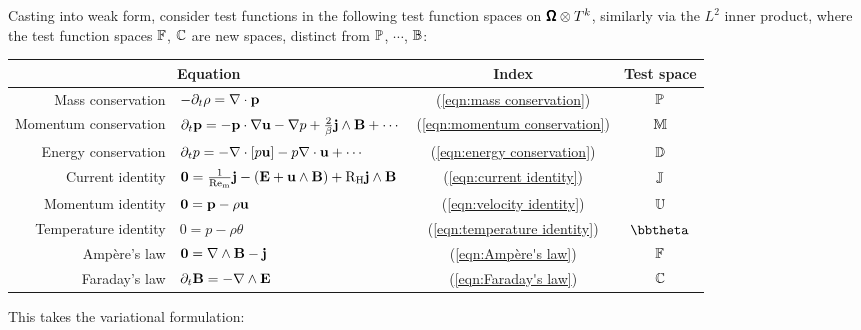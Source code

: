     Casting into weak form, consider test functions in the following test function spaces on $\pmb{\mathsf{\Omega}}\otimes T^{k}$, similarly via the $L^{2}$ inner product, where the test function spaces $\mathbb{F}$, $\mathbb{C}$ are new spaces, distinct from $\mathbb{P}$, $\cdots$, $\mathbb{B}$:
    \begin{center}\begin{tabular}{ r l c | c }
        \multicolumn{2}{c}{Equation}  &  Index  &  Test space  \\
        \hline\hline
        Mass conservation  &  $- \partial_{t}\rho  =  \nabla\cdot\mathbf{p}$  &  (\ref{eqn:mass conservation})  &  $\mathbb{P}$  \\
        Momentum conservation  &  $\partial_{t}\mathbf{p} 
         =  - \mathbf{p}\cdot\nabla\mathbf{u} - \nabla p + \frac{2}{\beta}\mathbf{j}\wedge\mathbf{B} + \cdots$  &  (\ref{eqn:momentum conservation})  &  $\mathbb{M}$  \\
        Energy conservation  &  $\partial_{t}p  =  - \nabla\cdot[p\mathbf{u}] - p\nabla\cdot\mathbf{u} + \cdots$  &  (\ref{eqn:energy conservation})  &  $\mathbb{D}$  \\
        \hline
        Current identity  &  $\mathbf{0}  =  \frac{1}{\mathrm{Re}_{\mathrm{m}}}\mathbf{j} - \left(\mathbf{E} + \mathbf{u}\wedge\mathbf{B}\right) + \mathrm{R}_{\mathrm{H}}\mathbf{j}\wedge\mathbf{B}$  &  (\ref{eqn:current identity})  &  $\mathbb{J}$  \\
        \hline
        Momentum identity  &  $\mathbf{0}  =  \mathbf{p} - \rho\mathbf{u}$  &  (\ref{eqn:velocity identity})  &  $\mathbb{U}$  \\
        Temperature identity  &  $0  =  p - \rho\theta$  &  (\ref{eqn:temperature identity})  &  $\bbtheta$  \\
        \hline
        Ampère's law  &  $\mathbf{0}  =  \nabla\wedge\mathbf{B} - \mathbf{j}$  &  (\ref{eqn:Ampère's law})  &  $\mathbb{F}$  \\
        Faraday's law  &  $\partial_{t}\mathbf{B}  =  - \nabla\wedge\mathbf{E}$  &  (\ref{eqn:Faraday's law})  &  $\mathbb{C}$  \\
    \end{tabular}\end{center}
     This takes the variational formulation:
    
    \line

